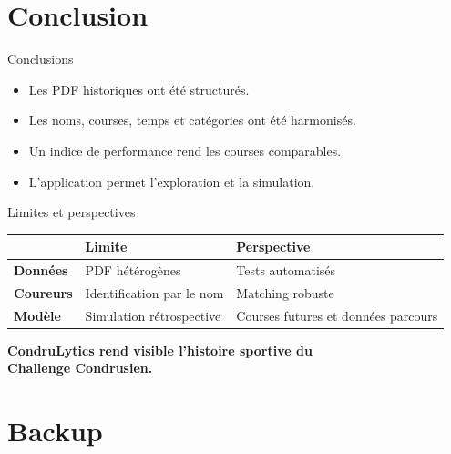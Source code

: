 \documentclass[aspectratio=169,11pt]{beamer}
\begin{document}
\section{Conclusion}

\begin{frame}{Conclusions}
      \begin{itemize}
        \item Les PDF historiques ont été structurés.
        \item Les noms, courses, temps et catégories ont été harmonisés.
        \item Un indice de performance rend les courses comparables.
        \item L'application permet l'exploration et la simulation.
      \end{itemize}
\end{frame}



\begin{frame}{Limites et perspectives}
  \begin{center}
    \renewcommand{\arraystretch}{1.7}
    \begin{tabular}{p{}p{}p{}}
      \toprule
      & \textbf{Limite} & \textbf{Perspective} \\
      \midrule
      \textbf{Données} &
      PDF hétérogènes &
      Tests automatisés \\
      \textbf{Coureurs} &
      Identification par le nom &
      Matching robuste \\
      \textbf{Modèle} &
      Simulation rétrospective &
      Courses futures et données parcours \\
      \bottomrule
    \end{tabular}
  \end{center}
\end{frame}

\begin{frame}{}
  \begin{center}
    {\Large\bfseries\color{condruBlue}
    CondruLytics rend visible l'histoire sportive du \\ Challenge Condrusien.}\\[0.5cm]
  \end{center}
\end{frame}



\appendix
\section{Backup}
\end{document}
